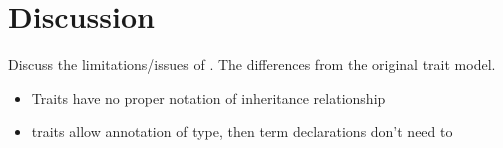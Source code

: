 
\section{Discussion}
\label{sec:discuss}

Discuss the limitations/issues of \name. The differences from the original trait model.



\begin{itemize}
\item Traits have no proper notation of inheritance relationship
\item traits allow annotation of type, then term declarations don't need to
\end{itemize}